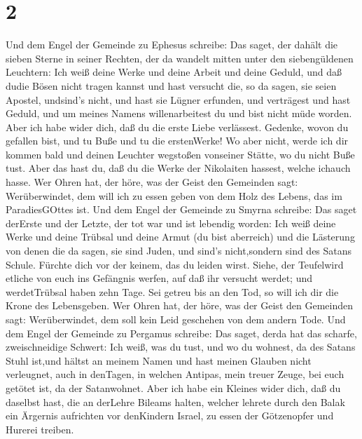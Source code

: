 \hypertarget{section}{%
\section{2}\label{section}}

 Und dem Engel der Gemeinde zu Ephesus schreibe: Das saget,
der dahält die sieben Sterne in seiner Rechten, der da wandelt mitten
unter den siebengüldenen Leuchtern:  Ich weiß deine Werke
und deine Arbeit und deine Geduld, und daß dudie Bösen nicht tragen
kannst und hast versucht die, so da sagen, sie seien Apostel, undsind's
nicht, und hast sie Lügner erfunden,  und verträgest und
hast Geduld, und um meines Namens willenarbeitest du und bist nicht müde
worden.  Aber ich habe wider dich, daß du die erste Liebe
verlässest.  Gedenke, wovon du gefallen bist, und tu Buße
und tu die erstenWerke! Wo aber nicht, werde ich dir kommen bald und
deinen Leuchter wegstoßen vonseiner Stätte, wo du nicht Buße tust.
 Aber das hast du, daß du die Werke der Nikolaiten hassest,
welche ichauch hasse.  Wer Ohren hat, der höre, was der
Geist den Gemeinden sagt: Werüberwindet, dem will ich zu essen geben von
dem Holz des Lebens, das im ParadiesGOttes ist.  Und dem
Engel der Gemeinde zu Smyrna schreibe: Das saget derErste und der
Letzte, der tot war und ist lebendig worden:  Ich weiß deine
Werke und deine Trübsal und deine Armut (du bist aberreich) und die
Lästerung von denen die da sagen, sie sind Juden, und sind's
nicht,sondern sind des Satans Schule.  Fürchte dich vor der
keinem, das du leiden wirst. Siehe, der Teufelwird etliche von euch ins
Gefängnis werfen, auf daß ihr versucht werdet; und werdetTrübsal haben
zehn Tage. Sei getreu bis an den Tod, so will ich dir die Krone des
Lebensgeben.  Wer Ohren hat, der höre, was der Geist den
Gemeinden sagt: Werüberwindet, dem soll kein Leid geschehen von dem
andern Tode.  Und dem Engel der Gemeinde zu Pergamus
schreibe: Das saget, derda hat das scharfe, zweischneidige Schwert:
 Ich weiß, was du tust, und wo du wohnest, da des Satans
Stuhl ist,und hältst an meinem Namen und hast meinen Glauben nicht
verleugnet, auch in denTagen, in welchen Antipas, mein treuer Zeuge, bei
euch getötet ist, da der Satanwohnet.  Aber ich habe ein
Kleines wider dich, daß du daselbst hast, die an derLehre Bileams
halten, welcher lehrete durch den Balak ein Ärgernis aufrichten vor
denKindern Israel, zu essen der Götzenopfer und Hurerei treiben.

